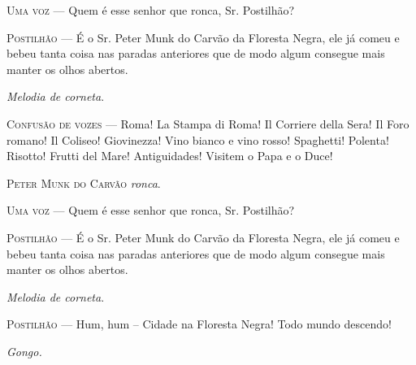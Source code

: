 \textsc{Uma voz} --- Quem é esse senhor que ronca, Sr. Postilhão?

\textsc{Postilhão} --- É o Sr. Peter Munk do Carvão da Floresta Negra, ele já
comeu e bebeu tanta coisa nas paradas anteriores que de modo algum
consegue mais manter os olhos abertos.

\emph{Melodia de corneta}.

\textsc{Confusão de vozes} --- Roma! La Stampa di Roma! Il Corriere della Sera! Il
Foro romano! Il Coliseo! Giovinezza! Vino bianco e vino rosso!
Spaghetti! Polenta! Risotto! Frutti del Mare! Antiguidades! Visitem o
Papa e o Duce!

\textsc{Peter Munk do Carvão} \emph{ronca}.

\textsc{Uma voz} --- Quem é esse senhor que ronca, Sr. Postilhão?

\textsc{Postilhão} --- É o Sr. Peter Munk do Carvão da Floresta Negra, ele já
comeu e bebeu tanta coisa nas paradas anteriores que de modo algum
consegue mais manter os olhos abertos.

\emph{Melodia de corneta}.

\textsc{Postilhão} --- Hum, hum -- Cidade na Floresta Negra! Todo mundo descendo!

\emph{Gongo.}

